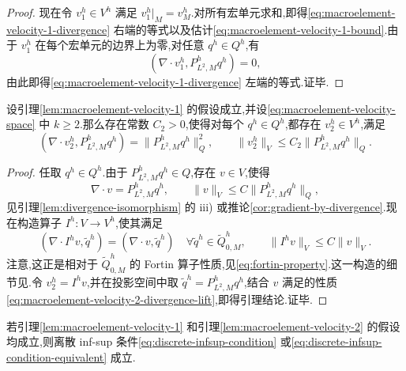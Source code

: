 \begin{proof}
现在令 $v_1^h\in V^h$ 满足 $v_1^h|_M=v_M^h$.对所有宏单元求和,即得\cref{eq:macroelement-velocity-1-divergence} 右端的等式以及估计\cref{eq:macroelement-velocity-1-bound}.由于 $v_1^h$ 在每个宏单元的边界上为零,对任意 $q^h\in Q^h$,有
\[
  (\nabla\cdot v_1^h,P_{L^2,M}^h q^h)=0,
\]
由此即得\cref{eq:macroelement-velocity-1-divergence} 左端的等式.证毕.
\end{proof}

\begin{lemma}[每个离散压力都存在具有特定性质的离散速度(二)]\label{lem:macroelement-velocity-2}
设引理\ref{lem:macroelement-velocity-1} 的假设成立,并设\cref{eq:macroelement-velocity-space} 中 $k\ge2$.那么存在常数 $C_2>0$,使得对每个 $q^h\in Q^h$,都存在 $v_2^h\in V^h$,满足
\[
  (\nabla\cdot v_2^h,P_{L^2,M}^h q^h)
  =\|P_{L^2,M}^h q^h\|_Q^2,
  \qquad
  \|v_2^h\|_V\le C_2\|P_{L^2,M}^h q^h\|_Q.
\]
\end{lemma}

\begin{proof}
任取 $q^h\in Q^h$.由于 $P_{L^2,M}^h q^h\in Q$,存在 $v\in V$,使得
\begin{equation}\label{eq:macroelement-velocity-2-divergence-lift}
  \nabla\cdot v=P_{L^2,M}^h q^h,
  \qquad
  \|v\|_V\le C\|P_{L^2,M}^h q^h\|_Q,
\end{equation}
见引理\ref{lem:divergence-isomorphism} 的 iii) 或推论\ref{cor:gradient-by-divergence}.现在构造算子 $I^h:V\to V^h$,使其满足
\[
  (\nabla\cdot I^h v,\widetilde q^h)
  =(\nabla\cdot v,\widetilde q^h)
  \quad\forall\widetilde q^h\in\widetilde Q_{0,M}^h,
  \qquad
  \|I^h v\|_V\le C\|v\|_V.
\]
注意,这正是相对于 $\widetilde Q_{0,M}^h$ 的 Fortin 算子性质,见\cref{eq:fortin-property}.这一构造的细节见\textcite{Stenberg1984}.令 $v_2^h=I^h v$,并在投影空间中取 $\widetilde q^h=P_{L^2,M}^h q^h$,结合 $v$ 满足的性质\cref{eq:macroelement-velocity-2-divergence-lift},即得引理结论.证毕.
\end{proof}

\begin{theorem}\label{thm:stenberg-macroelement-condition}
若引理\ref{lem:macroelement-velocity-1} 和引理\ref{lem:macroelement-velocity-2} 的假设均成立,则离散 inf-sup 条件\cref{eq:discrete-infsup-condition} 或\cref{eq:discrete-infsup-condition-equivalent} 成立.
\end{theorem}

